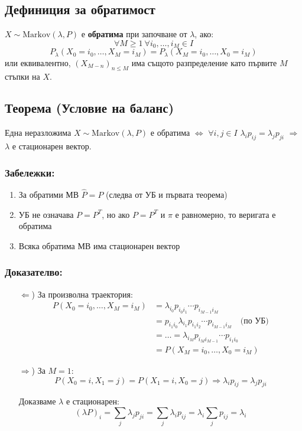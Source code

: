 \documentclass{article}
\begin{document}
\subsection{Дефиниция за обратимост}
$X \sim \text{Markov}(\lambda,P)$ е \textbf{обратима} при започване от $\lambda$, ако:
$$\forall M \geq 1\ \forall i_0,\dots,i_M \in I$$
$$P_\lambda(X_0=i_0, \dots, X_M=i_M) = P_\lambda(X_M=i_0, \dots, X_0=i_M)$$
или еквивалентно, $(X_{M-n})_{n \leq M}$ има същото разпределение като първите $M$ стъпки на $X$.

\subsection{Теорема (Условие на баланс)}
Една неразложима $X \sim \text{Markov}(\lambda,P)$ е обратима $\Leftrightarrow$ $\forall i,j \in I$ $\lambda_i p_{ij} = \lambda_j p_{ji}$ $\Rightarrow$ $\lambda$ е стационарен вектор.

\subsubsection*{Забележки:}
\begin{enumerate}
\item За обратими МВ $\hat{P} = P$ (следва от УБ и първата теорема)
\item УБ не означава $P = P^T$, но ако $P = P^T$ и $\pi$ е равномерно, то веригата е обратима
\item Всяка обратима МВ има стационарен вектор
\end{enumerate}

\subsubsection*{Доказателво:}
\begin{itemize}
\item[$\Leftarrow$)] За произволна траектория:
\begin{align*}
P(X_0=i_0, \dots, X_M=i_M) &= \lambda_{i_0} p_{i_0 i_1} \cdots p_{i_{M-1} i_M} \\
&= p_{i_1 i_0} \lambda_{i_1} p_{i_1 i_2} \cdots p_{i_{M-1} i_M} \quad \text{(по УБ)} \\
&= \dots = \lambda_{i_M} p_{i_M i_{M-1}} \cdots p_{i_1 i_0} \\
&= P(X_M=i_0, \dots, X_0=i_M)
\end{align*}

\item[$\Rightarrow$)] За $M=1$:
$$P(X_0=i, X_1=j) = P(X_1=i, X_0=j) \Rightarrow \lambda_i p_{ij} = \lambda_j p_{ji}$$

Доказваме $\lambda$ е стационарен:
$$(\lambda P)_i = \sum_j \lambda_j p_{ji} = \sum_j \lambda_i p_{ij} = \lambda_i \sum_j p_{ij} = \lambda_i$$
\end{itemize}
\end{document}
